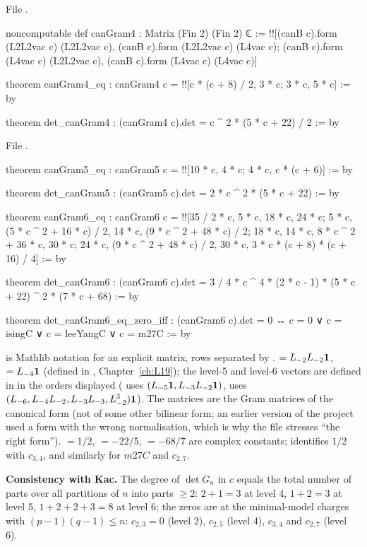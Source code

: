 File .
\begin{leancode}
noncomputable def canGram4 : Matrix (Fin 2) (Fin 2) ℂ :=
  !![(canB c).form (L2L2vac c) (L2L2vac c), (canB c).form (L2L2vac c) (L4vac c);
     (canB c).form (L4vac c) (L2L2vac c), (canB c).form (L4vac c) (L4vac c)]

theorem canGram4_eq :
    canGram4 c = !![c * (c + 8) / 2, 3 * c; 3 * c, 5 * c] := by

theorem det_canGram4 : (canGram4 c).det = c ^ 2 * (5 * c + 22) / 2 := by
\end{leancode}
File .
\begin{leancode}
theorem canGram5_eq : canGram5 c = !![10 * c, 4 * c; 4 * c, c * (c + 6)] := by

theorem det_canGram5 : (canGram5 c).det = 2 * c ^ 2 * (5 * c + 22) := by

theorem canGram6_eq :
    canGram6 c =
      !![35 / 2 * c, 5 * c, 18 * c, 24 * c;
         5 * c, (5 * c ^ 2 + 16 * c) / 2, 14 * c, (9 * c ^ 2 + 48 * c) / 2;
         18 * c, 14 * c, 8 * c ^ 2 + 36 * c, 30 * c;
         24 * c, (9 * c ^ 2 + 48 * c) / 2, 30 * c,
           3 * c * (c + 8) * (c + 16) / 4] := by

theorem det_canGram6 :
    (canGram6 c).det = 3 / 4 * c ^ 4 * (2 * c - 1) * (5 * c + 22) ^ 2 * (7 * c + 68) := by

theorem det_canGram6_eq_zero_iff :
    (canGram6 c).det = 0 ↔ c = 0 ∨ c = isingC ∨ c = leeYangC ∨ c = m27C := by
\end{leancode}

\begin{dictionary}
\lean{!![a, b; c, d]} is Mathlib notation for an explicit matrix, rows separated by \lean{;}.
 $= L_{-2}L_{-2}\mathbf{1}$,  $= L_{-4}\mathbf{1}$ (defined in
, Chapter~\ref{ch:L19}); the level-5 and level-6 vectors are defined in
 in the orders displayed ( uses $(L_{-5}\mathbf{1},
L_{-3}L_{-2}\mathbf{1})$,  uses $(L_{-6},L_{-4}L_{-2},L_{-3}L_{-3},L_{-2}^3)\mathbf{1}$). The
matrices are the Gram matrices of the canonical form (not of some other bilinear form; an earlier
version of the project used a form with the wrong normalisation, which is why the file stresses ``the
right form'').  $= 1/2$,  $= -22/5$,  $= -68/7$ are complex
constants; \allowbreak{}\allowbreak{} identifies $1/2$ with $c_{3,4}$, and similarly for $m27C$
and $c_{2,7}$.

\textbf{Consistency with Kac.} The degree of $\det G_n$ in $c$ equals the total number of parts over all
partitions of $n$ into parts $\ge2$: $2+1 = 3$ at level 4, $1+2 = 3$ at level 5, $1+2+2+3 = 8$ at level 6;
the zeros are at the minimal-model charges with $(p-1)(q-1)\le n$: $c_{2,3} = 0$ (level 2), $c_{2,5}$
(level 4), $c_{3,4}$ and $c_{2,7}$ (level 6).
\end{dictionary}

